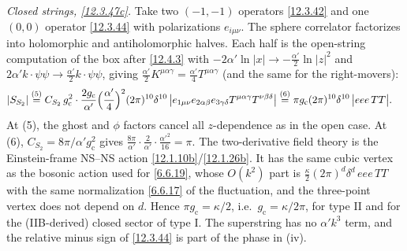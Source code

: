 \begin{tcolorbox}[breakable]
\begin{remark}
		\emph{Closed strings, \eqref{12.3.47c}.} Take two $(-1,-1)$ operators \eqref{12.3.42} and one $(0,0)$ operator \eqref{12.3.44} with polarizations $e_{i\mu\nu}$. The sphere correlator factorizes into holomorphic and antiholomorphic halves. Each half is the open-string computation of the box after \eqref{12.4.3} with $-2\alpha'\ln\lvert x\rvert\to-\frac{\alpha'}{2}\ln\lvert z\rvert^{2}$ and $2\alpha'k\cdot\psi\psi\to\frac{\alpha'}{2}k\cdot\psi\psi$, giving $\frac{\alpha'}{2}K^{\mu\alpha\gamma}=\frac{\alpha'}{4}T^{\mu\alpha\gamma}$ (and the same for the right-movers):
		\begin{align*}
			\lvert S_{S_{2}}\rvert
			&\overset{(5)}{=} C_{S_{2}}\,g_{\mathrm c}^{2}\cdot\frac{2g_{\mathrm c}}{\alpha'}\Bigl(\frac{\alpha'}{4}\Bigr)^{2}(2\pi)^{10}\delta^{10}\,\bigl\lvert e_{1\mu\nu}e_{2\alpha\beta}e_{3\gamma\delta}T^{\mu\alpha\gamma}T^{\nu\beta\delta}\bigr\rvert
			\overset{(6)}{=} \pi g_{\mathrm c}(2\pi)^{10}\delta^{10}\,\bigl\lvert eee\,TT\bigr\rvert .
		\end{align*}
		At (5), the ghost and $\phi$ factors cancel all $z$-dependence as in the open case. At (6), $C_{S_{2}}=8\pi/\alpha'g_{\mathrm c}^{2}$ gives $\frac{8\pi}{\alpha'}\cdot\frac{2}{\alpha'}\cdot\frac{\alpha'^{2}}{16}=\pi$. The two-derivative field theory is the Einstein-frame NS--NS action \eqref{12.1.10b}/\eqref{12.1.26b}. It has the same cubic vertex as the bosonic action used for \eqref{6.6.19}, whose $O(k^{2})$ part is $\frac{\kappa}{2}(2\pi)^{d}\delta^{d}\,eee\,TT$ with the same normalization \eqref{6.6.17} of the fluctuation, and the three-point vertex does not depend on $d$. Hence $\pi g_{\mathrm c}=\kappa/2$, i.e.\ $g_{\mathrm c}=\kappa/2\pi$, for type II and for the (IIB-derived) closed sector of type I. The superstring has no $\alpha'k^{3}$ term, and the relative minus sign of \eqref{12.3.44} is part of the phase in (iv).


\end{remark}
\end{tcolorbox}

